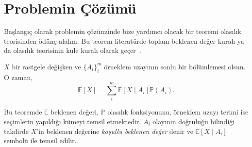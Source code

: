 \section{Problemin \c{C}\"{o}z\"{u}m\"{u}}
\label{sec:solution}

Ba\c{s}lang{\i}\c{c} olarak problemin \c{c}\"{o}z\"{u}m\"{u}nde bize
yard{\i}mc{\i} olacak bir teoremi olas{\i}l{\i}k teorisinden \"{o}d\"{u}n\c{c}
alal{\i}m. Bu teorem literat\"{u}rde toplam beklenen de\u{g}er kural{\i} ya da
olas{\i}l{\i}k teorisinin kule kural{\i} olarak
ge\c{c}er~\cite{bertsekas2002introduction}.

\begin{thm} \label{thm:kule}
    $X$ bir rastgele de\u{g}i\c{s}ken ve $\{A_i\}_i^m$ \"{o}rneklem
    uzay{\i}n{\i}n sonlu bir b\"{o}l\"{u}mlemesi olsun. O zaman, 
    \[ \mathbb{E}[X] = \sum_i^m \mathbb{E}\left[ X \mid A_i \right]
    \mathbb{P}(A_i). \]
\end{thm}
%
\noindent Bu teoremde $\mathbb{E}$ beklenen de\u{g}eri, $\mathbb{P}$
olas{\i}l{\i}k fonksiyonunu, \"{o}rneklem uzay{\i} terimi ise se\c{c}imlerin
yap{\i}ld{\i}\u{g}{\i} k\"{u}meyi temsil etmektedir. $A_i$ olay{\i}n{\i}n
do\u{g}rulu\u{g}u bilindi\u{g}i takdirde $X$'in beklenen de\u{g}erine
\textit{ko\c{s}ullu beklenen de\u{g}er} denir ve $\mathbb{E}\left[ X \mid A_i
\right]$ sembol\"{u} ile temsil edilir.

